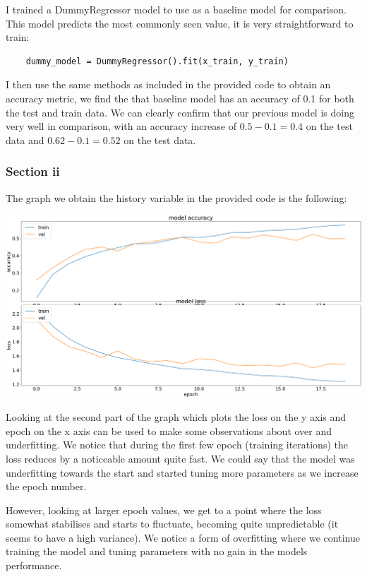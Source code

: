 \documentclass[10pt]{article}
\begin{document}
I trained a DummyRegressor model to use as a baseline model for comparison.
This model predicts the most commonly seen value, it is very
straightforward to train:
\begin{lstlisting}
    dummy_model = DummyRegressor().fit(x_train, y_train)
\end{lstlisting}

I then use the same methods as included in the provided code to
obtain an accuracy metric, we find the that baseline model
has an accuracy of 0.1 for both the test and train data. We can 
clearly confirm that our previous model is doing very well in comparison, with an accuracy increase of
$0.5 - 0.1 = 0.4$ on the test data and $0.62 - 0.1 = 0.52$ on the test data.

\subsubsection*{Section ii}
The graph we obtain the history variable in the provided code is the following:

\begin{center}
    \includegraphics[scale=0.23]{default_5k.png}
\end{center}

Looking at the second part of the graph which plots the loss on the y axis and epoch on the x axis
can be used to make some observations about over and underfitting.
We notice that during the first few epoch (training iterations)
the loss reduces by a noticeable amount quite fast. We could say that
the model was underfitting towards the start and started tuning more
parameters as we increase the epoch number.

However, looking at larger epoch values, we get to a point where the loss somewhat stabilises and starts to fluctuate, becoming
quite unpredictable (it seems to have a high variance). We notice a form of overfitting
where we continue training the model and tuning parameters with no gain in the models performance.
\end{document}
